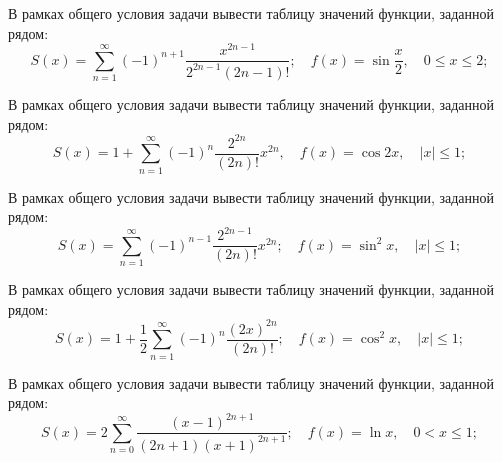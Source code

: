 \zzsectionVARIATIONS


\begin{zztask}
В рамках общего условия задачи вывести таблицу значений функции, заданной рядом:
\[ %
	S(x)= \sum_{n=1}^\infty (-1)^{n+1} \frac{x^{2n-1}}{2^{2n-1}(2n-1)!};\quad
	f(x)= \sin \frac{x}{2},
	\quad 0 \leq x \leq 2;
\]
\end{zztask}


\begin{zztask}
В рамках общего условия задачи вывести таблицу значений функции, заданной рядом:
\[ %
  S(x)= 1 + \sum_{n=1}^\infty (-1)^n \frac{2^{2n}}{(2n)!} x^{2n},\quad
  f(x)= \cos 2x,
  \quad |x| \leq 1;
\]
\end{zztask}


\begin{zztask}
В рамках общего условия задачи вывести таблицу значений функции, заданной рядом:
\[ %
  S(x)= \sum_{n=1}^\infty (-1)^{n-1} \frac{2^{2n-1}}{(2n)!} x^{2n};\quad
  f(x)= \sin^2 x,
  \quad |x| \leq 1;
\]
\end{zztask}


\begin{zztask}
В рамках общего условия задачи вывести таблицу значений функции, заданной рядом:
\[ %
  S(x)= 1 + \frac{1}{2} \sum_{n=1}^\infty (-1)^n \frac{(2x)^{2n}}{(2n)!};\quad
  f(x)= \cos^2 x,
  \quad |x| \leq 1;
\]
\end{zztask}


\begin{zztask}
В рамках общего условия задачи вывести таблицу значений функции, заданной рядом:
\[
  S(x)= 2 \sum_{n=0}^\infty \frac{(x-1)^{2n+1}}{(2n+1)(x+1)^{2n+1}};\quad
  f(x)= \ln x,
  \quad 0 < x \leq 1;
\]
\end{zztask}


